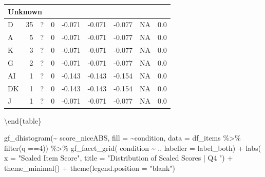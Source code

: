\documentclass[
  letterpaper,
  DIV=11,
  numbers=noendperiod]{scrreprt}
\newenvironment{Shaded}{\begin{snugshade}}{\end{snugshade}}
\newcommand{\AttributeTok}[1]{\textcolor[rgb]{0.40,0.45,0.13}{#1}}
\newcommand{\DecValTok}[1]{\textcolor[rgb]{0.68,0.00,0.00}{#1}}
\newcommand{\FunctionTok}[1]{\textcolor[rgb]{0.28,0.35,0.67}{#1}}
\newcommand{\NormalTok}[1]{\textcolor[rgb]{0.00,0.23,0.31}{#1}}
\newcommand{\SpecialCharTok}[1]{\textcolor[rgb]{0.37,0.37,0.37}{#1}}
\newcommand{\StringTok}[1]{\textcolor[rgb]{0.13,0.47,0.30}{#1}}
\begin{document}
\begin{tabular}[t]{l|r|l|r|r|r|r|r|r}
\hline
\multicolumn{9}{l}{\textbf{Unknown}}\\
\hline
\hspace{1em}D & 35 & ? & 0 & -0.071 & -0.071 & -0.077 & NA & 0.0\\
\hline
\hspace{1em}A & 5 & ? & 0 & -0.071 & -0.071 & -0.077 & NA & 0.0\\
\hline
\hspace{1em}K & 3 & ? & 0 & -0.071 & -0.071 & -0.077 & NA & 0.0\\
\hline
\hspace{1em}G & 2 & ? & 0 & -0.071 & -0.071 & -0.077 & NA & 0.0\\
\hline
\hspace{1em}AI & 1 & ? & 0 & -0.143 & -0.143 & -0.154 & NA & 0.0\\
\hline
\hspace{1em}DK & 1 & ? & 0 & -0.143 & -0.143 & -0.154 & NA & 0.0\\
\hline
\hspace{1em}J & 1 & ? & 0 & -0.071 & -0.071 & -0.077 & NA & 0.0\\
\hline
\end{tabular}

\textbackslash end\{table\}

\begin{Shaded}
\begin{Highlighting}[]
\FunctionTok{gf\_dhistogram}\NormalTok{(}\SpecialCharTok{\textasciitilde{}}\NormalTok{ score\_niceABS, }\AttributeTok{fill =} \SpecialCharTok{\textasciitilde{}}\NormalTok{condition, }\AttributeTok{data =}\NormalTok{ df\_items }\SpecialCharTok{\%\textgreater{}\%} \FunctionTok{filter}\NormalTok{(q }\SpecialCharTok{==}\DecValTok{4}\NormalTok{)) }\SpecialCharTok{\%\textgreater{}\%} 
  \FunctionTok{gf\_facet\_grid}\NormalTok{( condition }\SpecialCharTok{\textasciitilde{}}\NormalTok{ ., }\AttributeTok{labeller =}\NormalTok{ label\_both) }\SpecialCharTok{+} 
  \FunctionTok{labs}\NormalTok{( }\AttributeTok{x =} \StringTok{"Scaled Item Score"}\NormalTok{, }\AttributeTok{title =} \StringTok{"Distribution of Scaled Scores | Q4 "}\NormalTok{) }\SpecialCharTok{+} 
  \FunctionTok{theme\_minimal}\NormalTok{() }\SpecialCharTok{+} \FunctionTok{theme}\NormalTok{(}\AttributeTok{legend.position =} \StringTok{"blank"}\NormalTok{)}
\end{Highlighting}
\end{Shaded}
\end{document}
